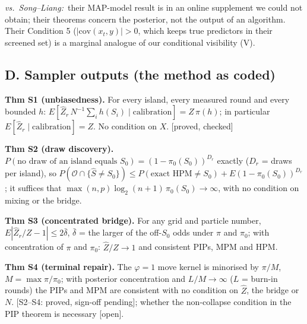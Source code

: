 \documentclass[10pt]{article}
\newcommand{\st}[1]{\textsf{\small[#1]}}
\newcommand{\SL}{\textit{vs.\ Song--Liang:}~}
\newcommand{\Shat}{\hat S}
\begin{document}
\SL their MAP-model result is in an online supplement we could not obtain; their theorems concern the posterior, not the output of an algorithm. Their Condition 5 ($|\mathrm{cov}(x_t,y)|>0$, which keeps true predictors in their screened set) is a marginal analogue of our conditional visibility (V).

\subsection*{D. Sampler outputs (the method as coded)}
\textbf{Thm S1 (unbiasedness).} For every island, every measured round and every bounded $h$: $E[\hat Z_r\,N^{-1}\textstyle\sum_i h(S_i)\mid\text{calibration}]=Z\,\pi(h)$; in particular $E[\hat Z_r\mid\text{calibration}]=Z$. No condition on $X$.
\st{proved, checked}

\textbf{Thm S2 (draw discovery).} $P(\text{no draw of an island equals }S_0)=(1-\pi_0(S_0))^{D_r}$ exactly ($D_r$ = draws per island), so $P(\mathcal O\cap\{\Shat\ne S_0\})\le P(\text{exact HPM}\ne S_0)+E(1-\pi_0(S_0))^{D_r}$; it suffices that $\max(n,p)\log_2(n+1)\,\pi_0(S_0)\to\infty$, with no condition on mixing or the bridge.

\textbf{Thm S3 (concentrated bridge).} For any grid and particle number, $E|\hat Z_r/Z-1|\le 2\bar\delta$, $\bar\delta$ = the larger of the off-$S_0$ odds under $\pi$ and $\pi_0$; with concentration of $\pi$ and $\pi_0$: $\hat Z/Z\to1$ and consistent PIPs, MPM and HPM.

\textbf{Thm S4 (terminal repair).} The $\varphi=1$ move kernel is minorised by $\pi/M$, $M=\max\pi/\pi_0$; with posterior concentration and $L/M\to\infty$ ($L$ = burn-in rounds) the PIPs and MPM are consistent with no condition on $\hat Z$, the bridge or $N$.
\st{S2--S4: proved, sign-off pending}; whether the non-collapse condition in the PIP theorem is necessary \st{open}.
\end{document}
